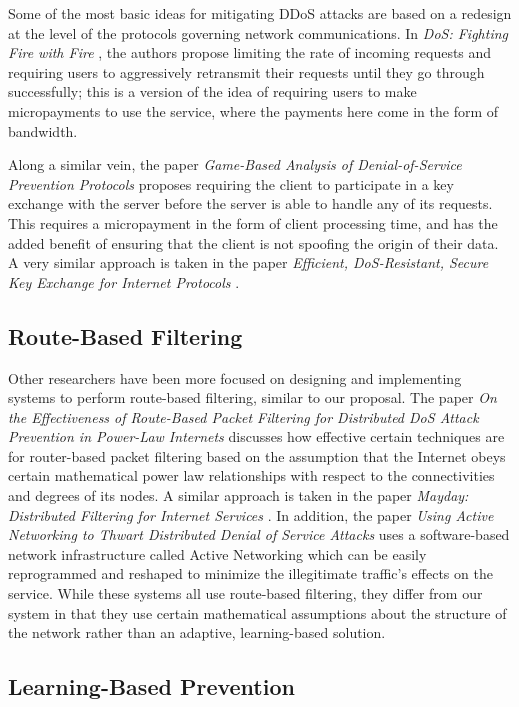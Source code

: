 \documentclass[twocolumn]{article}
\begin{document}
Some of the most basic ideas for mitigating DDoS attacks are based on a redesign at the level of the protocols governing network communications. In \emph{DoS: Fighting Fire with Fire} \cite{fire}, the authors propose limiting the rate of incoming requests and requiring users to aggressively retransmit their requests until they go through successfully; this is a version of the idea of requiring users to make micropayments to use the service, where the payments here come in the form of bandwidth.

Along a similar vein, the paper \emph{Game-Based Analysis of Denial-of-Service Prevention Protocols} \cite{game} proposes requiring the client to participate in a key exchange with the server before the server is able to handle any of its requests. This requires a micropayment in the form of client processing time, and has the added benefit of ensuring that the client is not spoofing the origin of their data. A very similar approach is taken in the paper \emph{Efficient, DoS-Resistant, Secure Key Exchange for Internet Protocols} \cite{key}.

\subsection{Route-Based Filtering}

Other researchers have been more focused on designing and implementing systems to perform route-based filtering, similar to our proposal. The paper \emph{On the Effectiveness of Route-Based Packet Filtering for Distributed DoS Attack Prevention in Power-Law Internets} \cite{power} discusses how effective certain techniques are for router-based packet filtering based on the assumption that the Internet obeys certain mathematical power law relationships with respect to the connectivities and degrees of its nodes. A similar approach is taken in the paper \emph{Mayday: Distributed Filtering for Internet Services} \cite{mayday}. In addition, the paper \emph{Using Active Networking to Thwart Distributed Denial of Service Attacks} \cite{active} uses a software-based network infrastructure called Active Networking which can be easily reprogrammed and reshaped to minimize the illegitimate traffic's effects on the service. While these systems all use route-based filtering, they differ from our system in that they use certain mathematical assumptions about the structure of the network rather than an adaptive, learning-based solution.

\subsection{Learning-Based Prevention}
\end{document}
